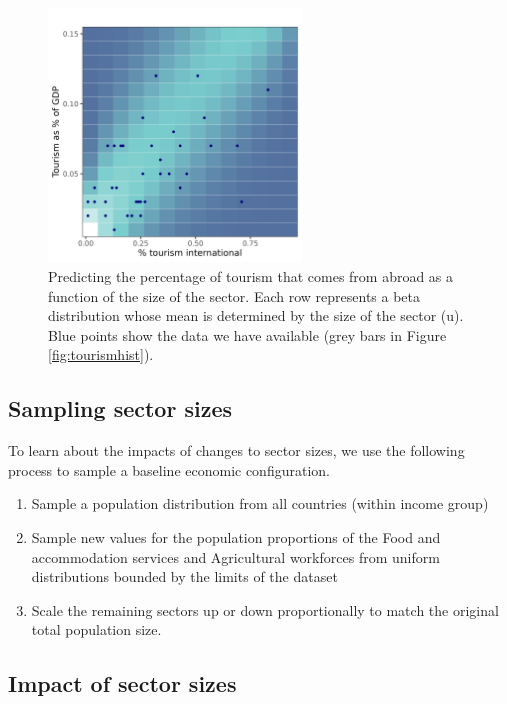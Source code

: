 \documentclass[
]{article}
\providecommand{\tightlist}{%
  \setlength{\itemsep}{0pt}\setlength{\parskip}{0pt}}
\begin{document}
\begin{figure}
\centering
\includegraphics[width=0.6\textwidth,height=\textheight]{sectortourism.png}
\caption{\label{fig:sectortourism} Predicting the percentage of tourism that comes from abroad as a function of the size of the sector. Each row represents a beta distribution whose mean is determined by the size of the sector (u). Blue points show the data we have available (grey bars in Figure \ref{fig:tourismhist}).}
\end{figure}

\newpage

\hypertarget{sampling-sector-sizes}{%
\subsection{Sampling sector sizes}\label{sampling-sector-sizes}}

To learn about the impacts of changes to sector sizes, we use the following process to sample a baseline economic configuration.

\begin{enumerate}
\def\labelenumi{\arabic{enumi}.}
\tightlist
\item
  Sample a population distribution from all countries (within income group)
\item
  Sample new values for the population proportions of the Food and accommodation services and Agricultural workforces from uniform distributions bounded by the limits of the dataset
\item
  Scale the remaining sectors up or down proportionally to match the original total population size.
\end{enumerate}

\hypertarget{impact-of-sector-sizes}{%
\subsection{Impact of sector sizes}\label{impact-of-sector-sizes}}
\end{document}
